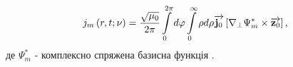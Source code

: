 \begin{equation} \label{eq:jm_base}
j_m \left( r, t; \nu \right) = \frac{\sqrt{\mu_0}}{2\pi} 
\int \limits_{0}^{2\pi} d \varphi \int \limits_{0}^{\infty} \rho d \rho 
\overrightarrow{\mathbf j_0} \left[  \nabla_\perp \Psi_m^*  \times  \overrightarrow{\mathbf z_0}  \right],
\end{equation}
%
де $ \Psi_m^* $ - комплексно спряжена базисна функція \cite{imp:Dumin2010}.
%
%
%
%
